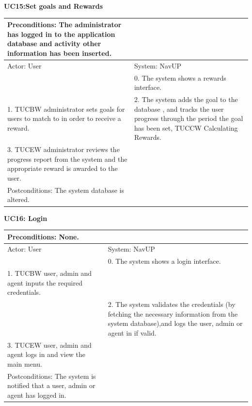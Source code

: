 \documentclass{article}
\begin{document}
        		\centering
					\textbf{UC15:Set goals and Rewards}\\
       		 \small
       		 \begin{tabular}{|p{8cm}|p{8cm}|}
       		 \hline
       		 Preconditions: The administrator has logged in to the application database and activity other information has been inserted.& \\
       		 \hline
       		 Actor: User & System: NavUP \\
        		\hline
       		 &0.	The system shows a rewards interface.\\
       		 \hline
       		1.	TUCBW administrator sets goals for users to match to in order to receive a reward.
 &2.	The system adds the goal to the database , and tracks the user progress through the period the goal has been set, TUCCW Calculating Rewards.
\\
        		\hline
       		3.	TUCEW administrator reviews the progress report from the system and the appropriate reward is awarded to the user.&\\
       		 \hline
        		Postconditions: The system database is altered. & \\
        		\hline
        \end{tabular} 
      

		
        		\centering
					\textbf{UC16: Login}\\
       		 \small
       		 \begin{tabular}{|p{8cm}|p{8cm}|}
       		 \hline
       		 Preconditions: None.& \\
       		 \hline
       		 Actor: User & System: NavUP \\
        		\hline
       		 &0.	The system shows a login interface.\\
       		 \hline
       		1.	TUCBW user, admin and agent inputs the required credentials.\\
 &2.	The system validates the credentials (by fetching the necessary information from the system database),and logs the user, admin or agent in if valid.
\\
        		\hline
       		3.	TUCEW user, admin and agent logs in and view the main menu.&\\
       		 \hline
        		Postconditions: The system is notified that a user, admin or agent has logged in. & \\
        		\hline
        \end{tabular} 
        
\end{document}
